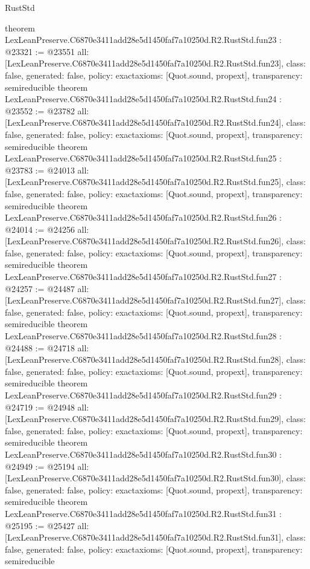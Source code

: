 \begin{lexlean}{RustStd}
\begin{coremodule}
{}
theorem LexLeanPreserve.C6870e3411add28e5d1450faf7a10250d.R2.RustStd.fun23 : @23321 := @23551 {
  all: [LexLeanPreserve.C6870e3411add28e5d1450faf7a10250d.R2.RustStd.fun23],
  class: false,
  generated: false,
  policy: exact{axioms: [Quot.sound, propext]},
  transparency: semireducible
}
theorem LexLeanPreserve.C6870e3411add28e5d1450faf7a10250d.R2.RustStd.fun24 : @23552 := @23782 {
  all: [LexLeanPreserve.C6870e3411add28e5d1450faf7a10250d.R2.RustStd.fun24],
  class: false,
  generated: false,
  policy: exact{axioms: [Quot.sound, propext]},
  transparency: semireducible
}
theorem LexLeanPreserve.C6870e3411add28e5d1450faf7a10250d.R2.RustStd.fun25 : @23783 := @24013 {
  all: [LexLeanPreserve.C6870e3411add28e5d1450faf7a10250d.R2.RustStd.fun25],
  class: false,
  generated: false,
  policy: exact{axioms: [Quot.sound, propext]},
  transparency: semireducible
}
theorem LexLeanPreserve.C6870e3411add28e5d1450faf7a10250d.R2.RustStd.fun26 : @24014 := @24256 {
  all: [LexLeanPreserve.C6870e3411add28e5d1450faf7a10250d.R2.RustStd.fun26],
  class: false,
  generated: false,
  policy: exact{axioms: [Quot.sound, propext]},
  transparency: semireducible
}
theorem LexLeanPreserve.C6870e3411add28e5d1450faf7a10250d.R2.RustStd.fun27 : @24257 := @24487 {
  all: [LexLeanPreserve.C6870e3411add28e5d1450faf7a10250d.R2.RustStd.fun27],
  class: false,
  generated: false,
  policy: exact{axioms: [Quot.sound, propext]},
  transparency: semireducible
}
theorem LexLeanPreserve.C6870e3411add28e5d1450faf7a10250d.R2.RustStd.fun28 : @24488 := @24718 {
  all: [LexLeanPreserve.C6870e3411add28e5d1450faf7a10250d.R2.RustStd.fun28],
  class: false,
  generated: false,
  policy: exact{axioms: [Quot.sound, propext]},
  transparency: semireducible
}
theorem LexLeanPreserve.C6870e3411add28e5d1450faf7a10250d.R2.RustStd.fun29 : @24719 := @24948 {
  all: [LexLeanPreserve.C6870e3411add28e5d1450faf7a10250d.R2.RustStd.fun29],
  class: false,
  generated: false,
  policy: exact{axioms: [Quot.sound, propext]},
  transparency: semireducible
}
theorem LexLeanPreserve.C6870e3411add28e5d1450faf7a10250d.R2.RustStd.fun30 : @24949 := @25194 {
  all: [LexLeanPreserve.C6870e3411add28e5d1450faf7a10250d.R2.RustStd.fun30],
  class: false,
  generated: false,
  policy: exact{axioms: [Quot.sound, propext]},
  transparency: semireducible
}
theorem LexLeanPreserve.C6870e3411add28e5d1450faf7a10250d.R2.RustStd.fun31 : @25195 := @25427 {
  all: [LexLeanPreserve.C6870e3411add28e5d1450faf7a10250d.R2.RustStd.fun31],
  class: false,
  generated: false,
  policy: exact{axioms: [Quot.sound, propext]},
  transparency: semireducible
}
\end{coremodule}
\end{lexlean}
